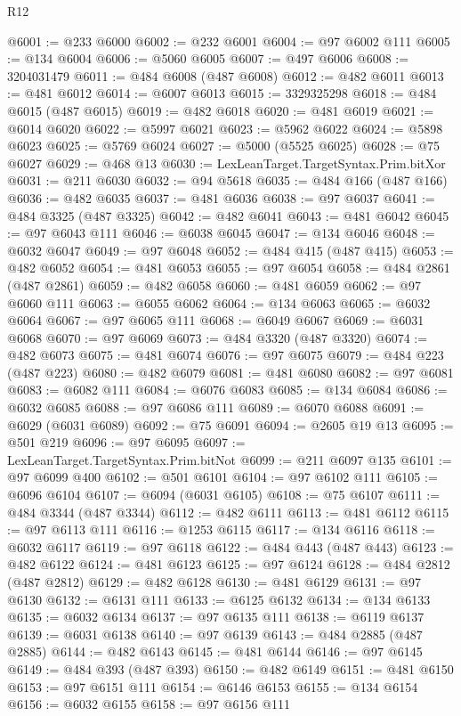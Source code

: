 \begin{lexlean}{R12}
\begin{coremodule}
@6001 := @233 @6000
@6002 := @232 @6001
@6004 := @97 @6002 @111
@6005 := @134 @6004
@6006 := @5060 @6005
@6007 := @497 @6006
@6008 := 3204031479
@6011 := @484 @6008 (@487 @6008)
@6012 := @482 @6011
@6013 := @481 @6012
@6014 := @6007 @6013
@6015 := 3329325298
@6018 := @484 @6015 (@487 @6015)
@6019 := @482 @6018
@6020 := @481 @6019
@6021 := @6014 @6020
@6022 := @5997 @6021
@6023 := @5962 @6022
@6024 := @5898 @6023
@6025 := @5769 @6024
@6027 := @5000 (@5525 @6025)
@6028 := @75 @6027
@6029 := @468 @13
@6030 := LexLeanTarget.TargetSyntax.Prim.bitXor
@6031 := @211 @6030
@6032 := @94 @5618
@6035 := @484 @166 (@487 @166)
@6036 := @482 @6035
@6037 := @481 @6036
@6038 := @97 @6037
@6041 := @484 @3325 (@487 @3325)
@6042 := @482 @6041
@6043 := @481 @6042
@6045 := @97 @6043 @111
@6046 := @6038 @6045
@6047 := @134 @6046
@6048 := @6032 @6047
@6049 := @97 @6048
@6052 := @484 @415 (@487 @415)
@6053 := @482 @6052
@6054 := @481 @6053
@6055 := @97 @6054
@6058 := @484 @2861 (@487 @2861)
@6059 := @482 @6058
@6060 := @481 @6059
@6062 := @97 @6060 @111
@6063 := @6055 @6062
@6064 := @134 @6063
@6065 := @6032 @6064
@6067 := @97 @6065 @111
@6068 := @6049 @6067
@6069 := @6031 @6068
@6070 := @97 @6069
@6073 := @484 @3320 (@487 @3320)
@6074 := @482 @6073
@6075 := @481 @6074
@6076 := @97 @6075
@6079 := @484 @223 (@487 @223)
@6080 := @482 @6079
@6081 := @481 @6080
@6082 := @97 @6081
@6083 := @6082 @111
@6084 := @6076 @6083
@6085 := @134 @6084
@6086 := @6032 @6085
@6088 := @97 @6086 @111
@6089 := @6070 @6088
@6091 := @6029 (@6031 @6089)
@6092 := @75 @6091
@6094 := @2605 @19 @13
@6095 := @501 @219
@6096 := @97 @6095
@6097 := LexLeanTarget.TargetSyntax.Prim.bitNot
@6099 := @211 @6097 @135
@6101 := @97 @6099 @400
@6102 := @501 @6101
@6104 := @97 @6102 @111
@6105 := @6096 @6104
@6107 := @6094 (@6031 @6105)
@6108 := @75 @6107
@6111 := @484 @3344 (@487 @3344)
@6112 := @482 @6111
@6113 := @481 @6112
@6115 := @97 @6113 @111
@6116 := @1253 @6115
@6117 := @134 @6116
@6118 := @6032 @6117
@6119 := @97 @6118
@6122 := @484 @443 (@487 @443)
@6123 := @482 @6122
@6124 := @481 @6123
@6125 := @97 @6124
@6128 := @484 @2812 (@487 @2812)
@6129 := @482 @6128
@6130 := @481 @6129
@6131 := @97 @6130
@6132 := @6131 @111
@6133 := @6125 @6132
@6134 := @134 @6133
@6135 := @6032 @6134
@6137 := @97 @6135 @111
@6138 := @6119 @6137
@6139 := @6031 @6138
@6140 := @97 @6139
@6143 := @484 @2885 (@487 @2885)
@6144 := @482 @6143
@6145 := @481 @6144
@6146 := @97 @6145
@6149 := @484 @393 (@487 @393)
@6150 := @482 @6149
@6151 := @481 @6150
@6153 := @97 @6151 @111
@6154 := @6146 @6153
@6155 := @134 @6154
@6156 := @6032 @6155
@6158 := @97 @6156 @111

\end{coremodule}
\end{lexlean}
